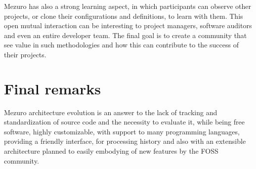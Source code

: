 \documentclass{llncs}
\begin{document}

Mezuro has also a strong learning aspect, in which participants can observe other
projects, or clone their configurations and definitions, to learn with them.
This open mutual interaction can be interesting to project managers, software
auditors and even an entire developer team. The final goal is to create a
community that see value in such methodologies and how this can contribute
to the success of their projects.

\section{Final remarks}

Mezuro architecture evolution is an answer to the lack of tracking and standardization
of source code and the necessity to evaluate it, while being free software,
highly customizable, with support to many programming languages, providing
a friendly interface, for processing history and also with an extensible
architecture planned to easily embodying of new features by the FOSS community.




\end{document}
